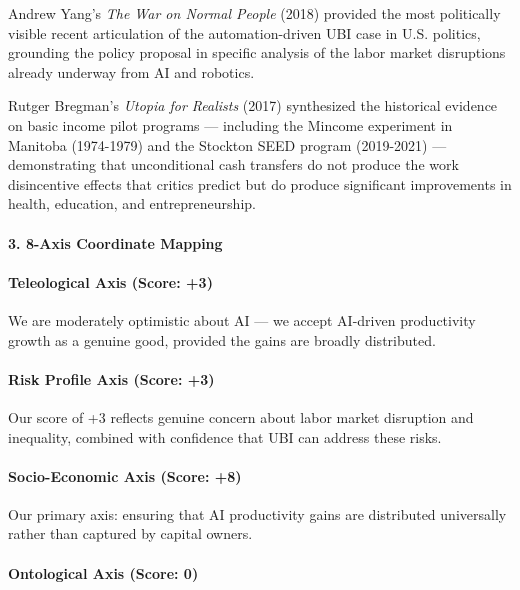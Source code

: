 Andrew Yang's \emph{The War on Normal People} (2018) provided the most
politically visible recent articulation of the automation-driven UBI
case in U.S. politics, grounding the policy proposal in specific
analysis of the labor market disruptions already underway from AI and
robotics.

Rutger Bregman's \emph{Utopia for Realists} (2017) synthesized the
historical evidence on basic income pilot programs --- including the
Mincome experiment in Manitoba (1974-1979) and the Stockton SEED program
(2019-2021) --- demonstrating that unconditional cash transfers do not
produce the work disincentive effects that critics predict but do
produce significant improvements in health, education, and
entrepreneurship.

\paragraph{3. 8-Axis Coordinate
Mapping}\label{axis-coordinate-mapping-43}

\paragraph{Teleological Axis (Score:
+3)}\label{teleological-axis-score-3-1}

We are moderately optimistic about AI --- we accept AI-driven
productivity growth as a genuine good, provided the gains are broadly
distributed.

\paragraph{Risk Profile Axis (Score:
+3)}\label{risk-profile-axis-score-3-2}

Our score of +3 reflects genuine concern about labor market disruption
and inequality, combined with confidence that UBI can address these
risks.

\paragraph{Socio-Economic Axis (Score:
+8)}\label{socio-economic-axis-score-8-5}

Our primary axis: ensuring that AI productivity gains are distributed
universally rather than captured by capital owners.

\paragraph{Ontological Axis (Score:
0)}\label{ontological-axis-score-0-18}

